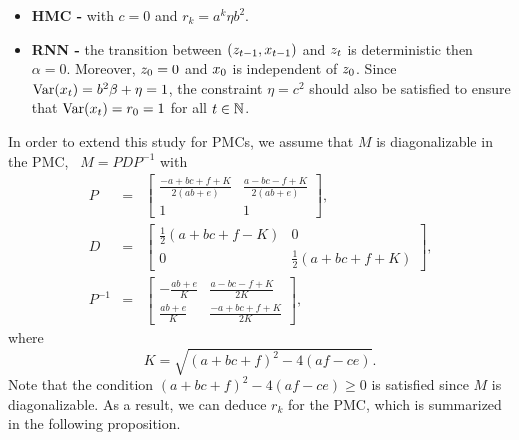 \begin{itemize}
\item \textbf{HMC -} with $c=0$ and  $r_k= a^{k} \eta b^2 $.
\item \textbf{RNN -} the transition between $(z_{t-1},x_{t-1})$ 
and $z_t$ is deterministic then $\alpha=0$. Moreover, 
$z_{0}=0$ and $x_{0}$ is independent of $z_{0}$. 
Since $\mathrm{Var}(x_t)= b^2 \beta+\eta = 1$, 
the constraint $\eta=c^2$ should also be satisfied to ensure that 
$\mathrm{Var}(x_t)=r_0=1$ for all $t \in \mathbb{N}$. 
\end{itemize}




In order to extend this study for PMCs, we assume that 
$M$ is diagonalizable in the PMC, \ie~$M=PDP^{-1}$ with
\begin{eqnarray*}
    P &=& \begin{bmatrix} \frac{-a+bc+f+K}{2(ab+e)} & \frac{a-bc-f+K}{2(ab+e)} \\ 1 & 1  \end{bmatrix} \text{,} \\
    D&=& \begin{bmatrix} \frac {1}{2}(a+bc+f-K) & 0 \\ 0 & \frac {1}{2}(a+bc+f+K) \end{bmatrix} \text{,} \\
    P^{-1}&=& \begin{bmatrix} -\frac{ab+e}{K} & \frac{a-bc-f+K}{2K} \\ \frac{ab+e}{K} & \frac{-a+bc+f+K}{2K} \end{bmatrix} \text{,}
\end{eqnarray*}
where 
$$K=\sqrt{(a+bc+f)^2-4(af-ce)} \text{.} $$
Note that the condition $(a+bc+f)^2-4(af-ce) \geq 0$ is satisfied
since $M$ is diagonalizable. 
As a result,  we can deduce  $r_k$ for the PMC, which is summarized in the following proposition.



